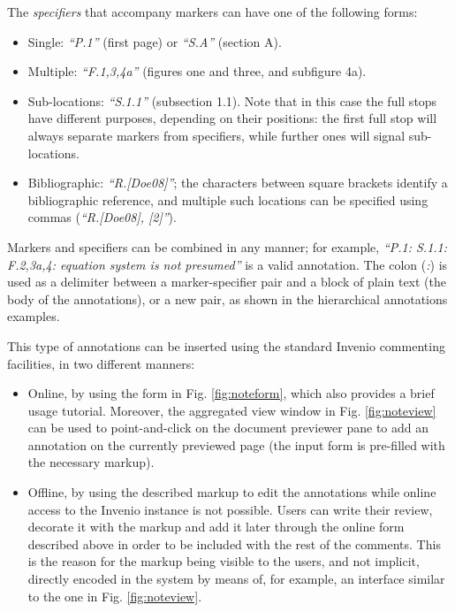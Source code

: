 \newpage

The \textit{specifiers} that accompany markers can have one of the following
forms:
\begin{itemize}
  \item Single: \textit{``P.1''} (first page) or \textit{``S.A''} (section A).
  \item Multiple: \textit{``F.1,3,4a''} (figures one and three, and subfigure 4a).
  \item Sub-locations: \textit{``S.1.1''} (subsection 1.1). Note that in this
                       case the full stops have different purposes, depending on
                       their positions: the first full stop will always separate
                       markers from specifiers, while further ones will signal
                       sub-locations.
  \item Bibliographic: \textit{``R.[Doe08]''}; the characters between square
                       brackets identify a bibliographic reference, and multiple
                       such locations can be specified using commas
                       (\textit{``R.[Doe08], [2]''}).
\end{itemize}

Markers and specifiers can be combined in any manner; for example,
\textit{``P.1: S.1.1: F.2,3a,4: equation system is not presumed''} is a valid
annotation.  The colon (\textit{:}) is used as a delimiter between a
marker-specifier pair and a block of plain text (the body of the annotations),
or a new pair, as shown in the hierarchical annotations examples.

This type of annotations can be inserted using the standard Invenio
commenting facilities, in two different manners:

\begin{itemize}
  \item Online, by using the form in Fig. \ref{fig:noteform}, which also
        provides a brief usage tutorial. Moreover, the aggregated view window in
        Fig. \ref{fig:noteview} can be used to point-and-click on the document
        previewer pane to add an annotation on the currently previewed page (the
        input form is pre-filled with the necessary markup).
  \item Offline, by using the described markup to edit the annotations while
        online access to the Invenio instance is not possible. Users can write
        their review, decorate it with the markup and add it later through the
        online form described above in order to be included with the rest of the
        comments. This is the reason for the markup being visible to the users,
        and not implicit, directly encoded in the system by means of, for
        example, an interface similar to the one in Fig. \ref{fig:noteview}.
\end{itemize}

